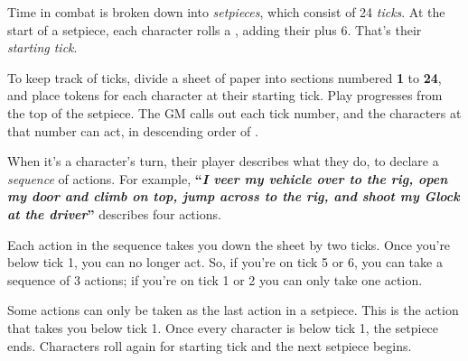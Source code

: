 
Time in combat is broken down into \emph{setpieces}, which consist of 24 \emph{ticks}. At the start of a setpiece, each character rolls a , adding their  plus 6. That's their \emph{starting tick}.

To keep track of ticks, divide a sheet of paper into sections numbered \textbf{1} to \textbf{24}, and place tokens for each character at their starting tick. Play progresses from the top of the setpiece. The GM calls out each tick number, and the characters at that number can act, in descending order of .

When it's a character's turn, their player describes what they do, to declare a \emph{sequence} of actions. For example, \textbf{``\emph{I veer my vehicle over to the rig, open my door and climb on top, jump across to the rig, and shoot my Glock at the driver}''} describes four actions.

Each action in the sequence takes you down the sheet by two ticks. Once you're below tick 1, you can no longer act. So, if you're on tick 5 or 6, you can take a sequence of 3 actions; if you're on tick 1 or 2 you can only take one action.

Some actions can only be taken as the last action in a setpiece. This is the action that takes you below tick 1. Once every character is below tick 1, the setpiece ends. Characters roll again for starting tick and the next setpiece begins.
